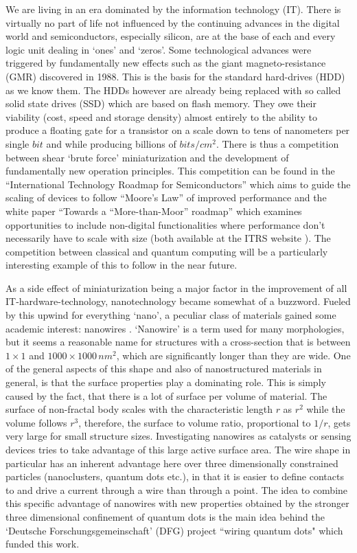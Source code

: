 


We are living in an era dominated by the information technology (IT). There is virtually no part of life not influenced by the continuing advances in the digital world and semiconductors, especially silicon, are at the base of each and every logic unit dealing in `ones' and `zeros'. Some technological advances were triggered by fundamentally new effects such as the giant magneto-resistance (GMR) discovered in 1988. This is the basis for the standard hard-drives (HDD) as we know them. The HDDs however are already being replaced with so called solid state drives (SSD) which are based on flash memory. They owe their viability (cost, speed and storage density) almost entirely to the ability to produce a floating gate for a transistor on a scale down to tens of nanometers per single $bit$ and while producing billions of $bits/cm^{2}$. There is thus a competition between shear `brute force' miniaturization and the development of fundamentally new operation principles. This competition can be found in the ``International Technology Roadmap for Semiconductors'' which aims to guide the scaling of devices to follow ``Moore's Law'' of improved performance and the white paper ``Towards a ``More-than-Moor'' roadmap'' which examines opportunities to include non-digital functionalities where performance don't necessarily have to scale with size (both available at the ITRS website  \cite{itrs_road_map_itrs_2015}). The competition between classical and quantum computing will be a particularly interesting example of this to follow in the near future.

As a side effect of miniaturization being a major factor in the improvement of all IT-hardware-technology, nanotechnology became somewhat of a buzzword. Fueled by this upwind for everything `nano', a peculiar class of materials gained some academic interest: nanowires \cite{xia_one-dimensional_2003,lieber_functional_2007}. `Nanowire' is a term used for many morphologies, but it seems a reasonable name for structures with a cross-section that is between $1\times1$ and $1000\times1000\,nm^2$, which are significantly longer than they are wide. One of the general aspects of this shape and also of nanostructured materials in general, is that the surface properties play a dominating role. This is simply caused by the fact, that there is a lot of surface per volume of material. The surface of non-fractal body scales with the characteristic length $r$ as $r^2$ while the volume follows $r^3$, therefore, the surface to volume ratio, proportional to $1/r$, gets very large for small structure sizes. Investigating nanowires as catalysts or sensing devices tries to take advantage of this large active surface area. The wire shape in particular has an inherent advantage here over three dimensionally constrained particles (nanoclusters, quantum dots etc.), in that it is easier to define contacts to and drive a current through a wire than through a point. The idea to combine this specific advantage of nanowires with new properties obtained by the stronger three dimensional confinement of quantum dots is the main idea behind the `Deutsche Forschungsgemeinschaft' (DFG) project ``wiring quantum dots" which funded this work. 

